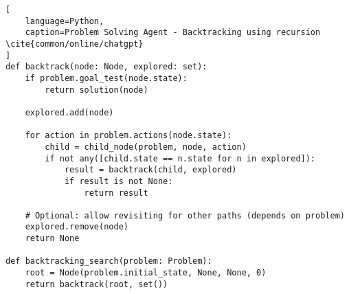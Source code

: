 \begin{lstlisting}[
    language=Python,
    caption=Problem Solving Agent - Backtracking using recursion \cite{common/online/chatgpt}
]
def backtrack(node: Node, explored: set):
    if problem.goal_test(node.state):
        return solution(node)

    explored.add(node)

    for action in problem.actions(node.state):
        child = child_node(problem, node, action)
        if not any([child.state == n.state for n in explored]):
            result = backtrack(child, explored)
            if result is not None:
                return result

    # Optional: allow revisiting for other paths (depends on problem)
    explored.remove(node)
    return None

def backtracking_search(problem: Problem):
    root = Node(problem.initial_state, None, None, 0)
    return backtrack(root, set())
\end{lstlisting}














